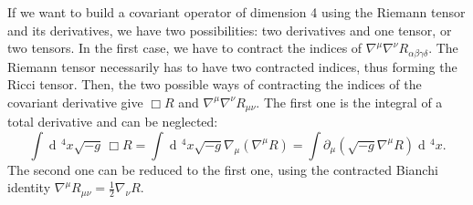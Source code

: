 \documentclass[a4paper,12pt]{book}
\newcommand{\dd}{\mathop{\mathrm{d}\!}{}}
\theoremstyle{definition}
\theoremstyle{remark}
\begin{document}
If we want to build a covariant operator of dimension 4 using the Riemann tensor and its derivatives, we have two possibilities: two derivatives and one tensor, or two tensors. In the first case, we have to contract the indices of $\nabla^\mu\nabla^\nu R_{\alpha\beta\gamma\delta}$. The Riemann tensor necessarily has to have two contracted indices, thus forming the Ricci tensor. Then, the two possible ways of contracting the indices of the covariant derivative give $\Box R$ and $\nabla^\mu\nabla^\nu R_{\mu\nu}$. The first one is the integral of a total derivative and can be neglected:
\[\int\dd^4x\sqrt{-g}\,\Box R=\int\dd^4x\sqrt{-g}\nabla_\mu(\nabla^\mu R)=\int\partial_\mu(\sqrt{-g}\nabla^\mu R)\dd^4x.\]
The second one can be reduced to the first one, using the contracted Bianchi identity $\nabla^\mu R_{\mu\nu}=\frac12\nabla_\nu R$.
\end{document}
